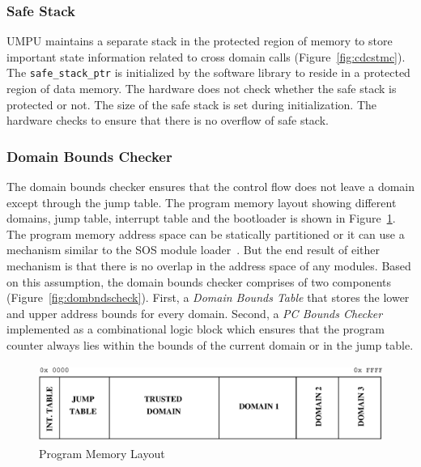 \subsubsection{Safe Stack}
\label{sec:umpuss}
%
UMPU maintains a separate stack in the protected region of memory to
store important state information related to cross domain calls
(Figure~\ref{fig:cdcstmc}).
%
The \texttt{safe\_stack\_ptr} is initialized by the software library
to reside in a protected region of data memory.
%
The hardware does not check whether the safe stack is protected or not.
%
The size of the safe stack is set during initialization.
%
The hardware checks to ensure that there is no overflow of safe stack.
%
\subsubsection{Domain Bounds Checker}
\label{sec:dombndschecker}
%
The domain bounds checker ensures that the control flow does not leave
a domain except through the jump table.
%
The program memory layout showing different domains, jump table,
interrupt table and the bootloader is shown in
Figure~\ref{fig:progmemlayout}.
%
The program memory address space can be statically partitioned
or it can use a mechanism similar to the SOS module
loader~\cite{ram05sos}.
%
But the end result of either mechanism is that there is no overlap in
the address space of any modules.
%
Based on this assumption, the domain bounds checker comprises of two
components (Figure~\ref{fig:dombndscheck}).
%
First, a \emph{Domain Bounds Table} that stores the lower and upper
address bounds for every domain.
%
Second, a \emph{PC Bounds Checker} implemented as a combinational logic
block which ensures that the program counter always lies within the
bounds of the current domain or in the jump table.
%
\begin{figure}[htbp]
   \centering
   \includegraphics[height=1in,
   keepaspectratio=true]{figures/progmemlayout.eps} 
   \caption{Program Memory Layout}
   \label{fig:progmemlayout}
\end{figure}
